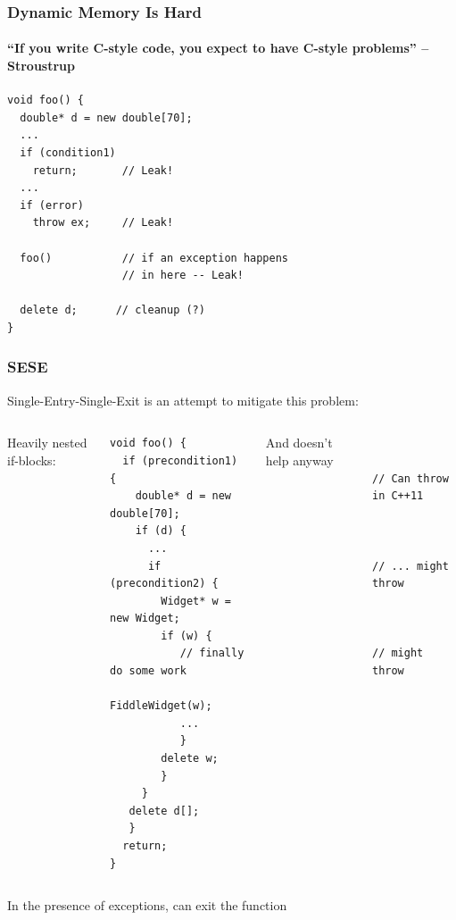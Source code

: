 
\begin{frame}[fragile,t]
\frametitle{Dynamic Memory Is Hard}
\framesubtitle{``If you write C-style code, you expect to have C-style problems'' -- Stroustrup}

{\scriptsize \begin{verbatim}
void foo() {
  double* d = new double[70];
  ...
  if (condition1)
    return;       // Leak!
  ...
  if (error)
    throw ex;     // Leak!

  foo()           // if an exception happens
                  // in here -- Leak!

  delete d;      // cleanup (?)
}
\end{verbatim}}
\end{frame}




\begin{frame}[fragile,t]
\frametitle{SESE}

Single-Entry-Single-Exit is an attempt to mitigate this problem:

\begin{columns}[t]
Heavily nested if-blocks:
{\scriptsize\begin{verbatim}
void foo() {
  if (precondition1) {
    double* d = new double[70];
    if (d) {
      ...
      if (precondition2) {
        Widget* w = new Widget;
        if (w) {
           // finally do some work
           FiddleWidget(w);
           ...
           }
        delete w;
        }
     }
   delete d[];
   }
  return;
}
\end{verbatim}}
\pause{}
And doesn't help anyway
{\scriptsize\begin{verbatim}


// Can throw in C++11



// ... might throw



// might throw






\end{verbatim}}
\end{columns}
\pause{}
In the presence of exceptions,  can exit the function
\end{frame}



